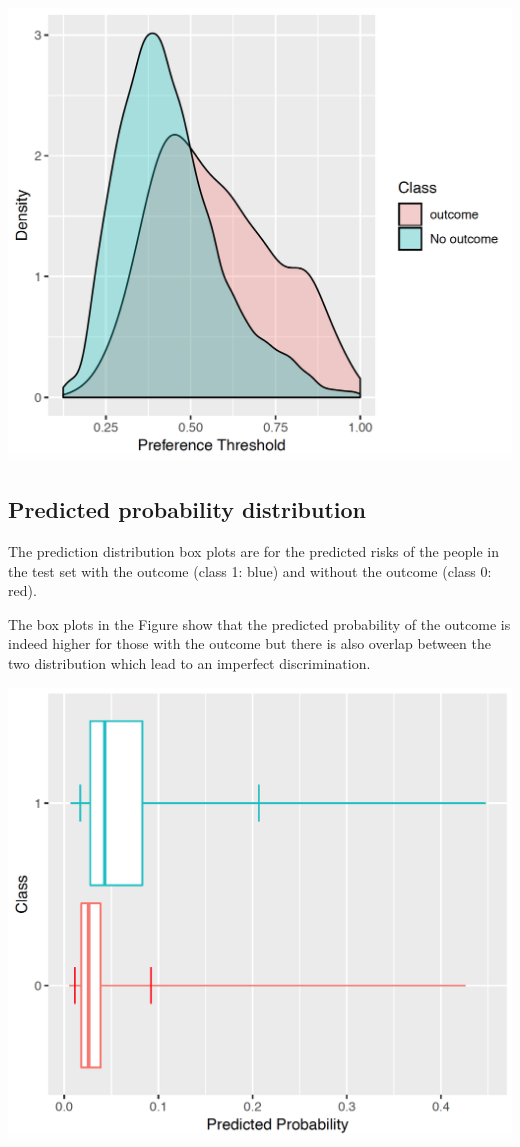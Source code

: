 \documentclass[]{book}
\begin{document}
\includegraphics[width=1\linewidth]{images/PatientLevelPrediction/preferencePDF}

\newpage

\subsection{Predicted probability
distribution}\label{predicted-probability-distribution}

The prediction distribution box plots are for the predicted risks of the
people in the test set with the outcome (class 1: blue) and without the
outcome (class 0: red).

The box plots in the Figure show that the predicted probability of the
outcome is indeed higher for those with the outcome but there is also
overlap between the two distribution which lead to an imperfect
discrimination.

\includegraphics[width=1\linewidth]{images/PatientLevelPrediction/predictionDistribution}
\end{document}
